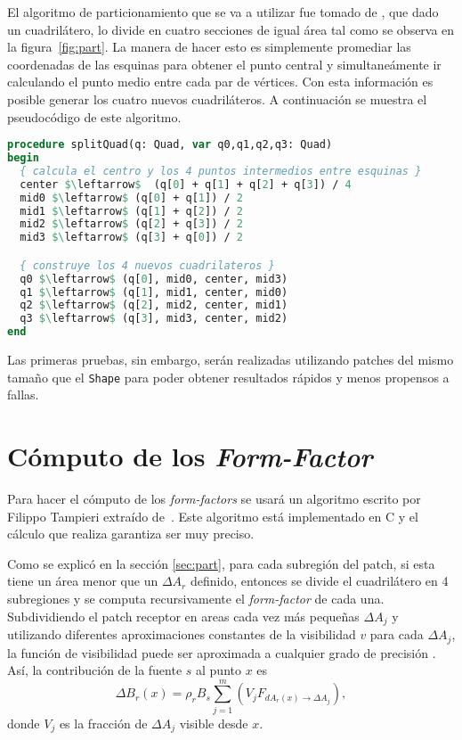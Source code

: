 \documentclass[letterpaper]{article}
\begin{document}
El algoritmo de particionamiento que se va a utilizar fue tomado de
\cite{ggems3}, que dado un cuadrilátero, lo divide en cuatro secciones
de igual área tal como se observa en la figura~\ref{fig:part}. La
manera de hacer esto es simplemente promediar las coordenadas de las
esquinas para obtener el punto central y simultaneámente ir calculando
el punto medio entre cada par de vértices. Con esta información es
posible generar los cuatro nuevos cuadriláteros. A continuación se
muestra el pseudocódigo de este algoritmo.
\pagebreak
\begin{lstlisting}[language=pascal,caption=Algoritmo de subdivisión de un cuadrilátero,frame=single,mathescape=True]
procedure splitQuad(q: Quad, var q0,q1,q2,q3: Quad) 
begin
  { calcula el centro y los 4 puntos intermedios entre esquinas }
  center $\leftarrow$  (q[0] + q[1] + q[2] + q[3]) / 4
  mid0 $\leftarrow$ (q[0] + q[1]) / 2
  mid1 $\leftarrow$ (q[1] + q[2]) / 2
  mid2 $\leftarrow$ (q[2] + q[3]) / 2
  mid3 $\leftarrow$ (q[3] + q[0]) / 2

  { construye los 4 nuevos cuadrilateros }
  q0 $\leftarrow$ (q[0], mid0, center, mid3)
  q1 $\leftarrow$ (q[1], mid1, center, mid0)
  q2 $\leftarrow$ (q[2], mid2, center, mid1)
  q3 $\leftarrow$ (q[3], mid3, center, mid2)
end
\end{lstlisting}
 
Las primeras pruebas, sin embargo, serán realizadas utilizando patches
del mismo tamaño que el \texttt{Shape} para poder obtener resultados
rápidos y menos propensos a fallas.

\section{Cómputo de los \textsl{Form-Factor}}
\label{sec:ff}
Para hacer el cómputo de los \textsl{form-factors} se usará un
algoritmo escrito por Filippo Tampieri extraído de~\cite{ggems3}. Este
algoritmo está implementado en C y el cálculo que realiza garantiza
ser muy preciso.

Como se explicó en la sección \ref{sec:part}, para cada subregión del
patch, si esta tiene un área menor que un $\Delta A_r$ definido,
entonces se divide el cuadrilátero en 4 subregiones y se computa
recursivamente el \textsl{form-factor} de cada una. Subdividiendo el
patch receptor en areas cada vez más pequeñas $\Delta A_j$ y
utilizando diferentes aproximaciones constantes de la visibilidad $v$
para cada $\Delta A_j$, la función de visibilidad puede ser aproximada
a cualquier grado de precisión \cite{ggems3}. Así, la contribución de
la fuente $s$ al punto $x$ es
$$\Delta B_r(x)=\rho_rB_s\sum_{j=1}^m(V_jF_{dA_r(x)\rightarrow\Delta A_j}),$$
donde $V_j$ es la fracción de $\Delta A_j$ visible desde $x$.
\end{document}
